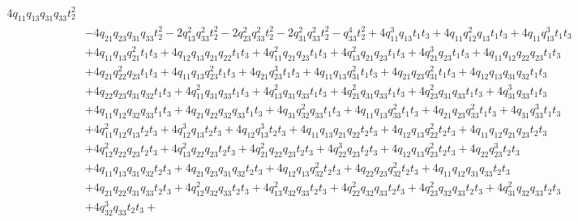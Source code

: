 \documentclass[10pt]{amsart}
\theoremstyle{definition}
\theoremstyle{corollary}
\theoremstyle{remark}
\theoremstyle{conclusion}
\begin{document}
{\begin{equation}
\begin{split}
4 q_{11} q_{13} q_{31} q_{33} t_{2}^2\\
& - 4 q_{21} q_{23} q_{31} q_{33} t_{2}^2 - 
2 q_{13}^2 q_{33}^2 t_{2}^2 - 2 q_{23}^2 q_{33}^2 t_{2}^2 - 2 q_{31}^2 q_{33}^2 t_{2}^2 - 
q_{33}^4 t_{2}^2 + 4 q_{11}^3 q_{13} t_{1} t_{3} + 4 q_{11} q_{12}^2 q_{13} t_{1} t_{3} + 
4 q_{11} q_{13}^3 t_{1} t_{3}\\
& + 4 q_{11} q_{13} q_{21}^2 t_{1} t_{3} + 
4 q_{12} q_{13} q_{21} q_{22} t_{1} t_{3} + 4 q_{11}^2 q_{21} q_{23} t_{1} t_{3} + 
4 q_{13}^2 q_{21} q_{23} t_{1} t_{3} + 4 q_{21}^3 q_{23} t_{1} t_{3} + 
4 q_{11} q_{12} q_{22} q_{23} t_{1} t_{3}\\
& + 4 q_{21} q_{22}^2 q_{23} t_{1} t_{3} + 
4 q_{11} q_{13} q_{23}^2 t_{1} t_{3} + 4 q_{21} q_{23}^3 t_{1} t_{3} + 4 q_{11} q_{13} q_{31}^2 t_{1} t_{3} + 
4 q_{21} q_{23} q_{31}^2 t_{1} t_{3} + 4 q_{12} q_{13} q_{31} q_{32} t_{1} t_{3} \\
&+ 
4 q_{22} q_{23} q_{31} q_{32} t_{1} t_{3} + 4 q_{11}^2 q_{31} q_{33} t_{1} t_{3} + 
4 q_{13}^2 q_{31} q_{33} t_{1} t_{3} + 4 q_{21}^2 q_{31} q_{33} t_{1} t_{3} + 
4 q_{23}^2 q_{31} q_{33} t_{1} t_{3} + 4 q_{31}^3 q_{33} t_{1} t_{3} \\
&+ 
4 q_{11} q_{12} q_{32} q_{33} t_{1} t_{3} + 4 q_{21} q_{22} q_{32} q_{33} t_{1} t_{3} + 
4 q_{31} q_{32}^2 q_{33} t_{1} t_{3} + 4 q_{11} q_{13} q_{33}^2 t_{1} t_{3} + 
4 q_{21} q_{23} q_{33}^2 t_{1} t_{3} + 4 q_{31} q_{33}^3 t_{1} t_{3} \\
&+ 4 q_{11}^2 q_{12} q_{13} t_{2} t_{3} + 
4 q_{12}^3 q_{13} t_{2} t_{3} + 4 q_{12} q_{13}^3 t_{2} t_{3} + 4 q_{11} q_{13} q_{21} q_{22} t_{2} t_{3} + 
4 q_{12} q_{13} q_{22}^2 t_{2} t_{3} + 4 q_{11} q_{12} q_{21} q_{23} t_{2} t_{3} \\
&+ 
4 q_{12}^2 q_{22} q_{23} t_{2} t_{3} + 4 q_{13}^2 q_{22} q_{23} t_{2} t_{3} + 
4 q_{21}^2 q_{22} q_{23} t_{2} t_{3} + 4 q_{22}^3 q_{23} t_{2} t_{3} + 4 q_{12} q_{13} q_{23}^2 t_{2} t_{3} + 
4 q_{22} q_{23}^3 t_{2} t_{3} \\
&+ 4 q_{11} q_{13} q_{31} q_{32} t_{2} t_{3} + 
4 q_{21} q_{23} q_{31} q_{32} t_{2} t_{3} + 4 q_{12} q_{13} q_{32}^2 t_{2} t_{3} + 
4 q_{22} q_{23} q_{32}^2 t_{2} t_{3} + 4 q_{11} q_{12} q_{31} q_{33} t_{2} t_{3} \\
&+ 
4 q_{21} q_{22} q_{31} q_{33} t_{2} t_{3} + 4 q_{12}^2 q_{32} q_{33} t_{2} t_{3} + 
4 q_{13}^2 q_{32} q_{33} t_{2} t_{3} + 4 q_{22}^2 q_{32} q_{33} t_{2} t_{3} + 
4 q_{23}^2 q_{32} q_{33} t_{2} t_{3} + 4 q_{31}^2 q_{32} q_{33} t_{2} t_{3} \\
&+ 4 q_{32}^3 q_{33} t_{2} t_{3} + 

\end{split}
\end{equation}}
\end{document}
